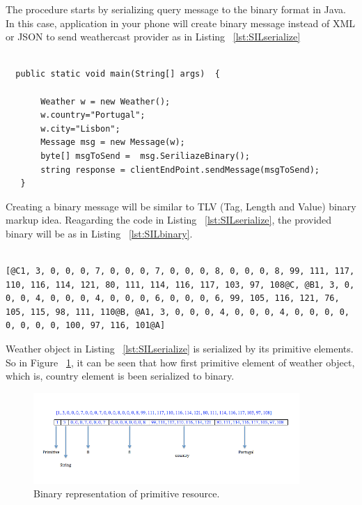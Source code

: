 The procedure starts by serializing query message to the binary format in Java. In this case, application in your phone will create binary message instead of XML or JSON to send weathercast provider as in Listing ~\ref{lst:SILserialize}
\begin{lstlisting}[caption=Creating serialized binary Message, label=lst:SILserialize]

  public static void main(String[] args)  {

       Weather w = new Weather();
       w.country="Portugal";
       w.city="Lisbon";
       Message msg = new Message(w);
       byte[] msgToSend =  msg.SeriliazeBinary();
       string response = clientEndPoint.sendMessage(msgToSend);
   }

\end{lstlisting}

Creating a binary message will be similar to TLV (Tag, Length and Value) binary markup idea. Reagarding the code in Listing ~\ref{lst:SILserialize}, the provided binary will be as in Listing ~\ref{lst:SILbinary}.

\begin{lstlisting}[caption=Creating serialized binary Message, label=lst:SILbinary]

[@C1, 3, 0, 0, 0, 7, 0, 0, 0, 7, 0, 0, 0, 8, 0, 0, 0, 8, 99, 111, 117, 110, 116, 114, 121, 80, 111, 114, 116, 117, 103, 97, 108@C, @B1, 3, 0, 0, 0, 4, 0, 0, 0, 4, 0, 0, 0, 6, 0, 0, 0, 6, 99, 105, 116, 121, 76, 105, 115, 98, 111, 110@B, @A1, 3, 0, 0, 0, 4, 0, 0, 0, 4, 0, 0, 0, 0, 0, 0, 0, 0, 100, 97, 116, 101@A]

\end{lstlisting}

Weather object in Listing ~\ref{lst:SILserialize} is serialized by its primitive elements. So in Figure ~\ref{fig:bianryprim}, it can be seen that how first primitive element of weather object, which is, country element is been serialized to binary.

\begin{figure}[!htb]
  \centering
  \includegraphics[width=0.9\textwidth]{Figures/binaryrep2.png}
  \caption[Binary representation of primitive resource.]{Binary representation of primitive resource.}
  \label{fig:bianryprim}
\end{figure}

